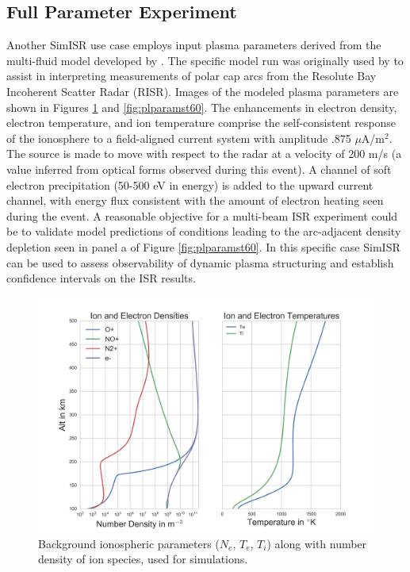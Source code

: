 \subsection{Full Parameter Experiment}
\label{sec:fullparam}
Another SimISR use case employs input plasma parameters derived from the multi-fluid model developed by \cite{semeter:plasmatransport2012}. The specific model run was originally used by \cite{Perry:2015jf} to assist in interpreting measurements of polar cap arcs from the Resolute Bay Incoherent Scatter Radar (RISR). Images of the modeled plasma parameters are shown in Figures \ref{fig:plparamst0} and \ref{fig:plparamst60}. The enhancements in electron density, electron temperature, and ion temperature comprise the self-consistent response of the ionosphere to a field-aligned current system with amplitude .875 $\mu$A/m$^2$.  The source is made to move with respect to the radar at a velocity of 200 m/s (a  value inferred from optical forms observed during this event).  A channel of soft electron precipitation (50-500 eV in energy) is added to the upward current channel, with energy flux consistent with the amount of electron heating seen during the event.  A reasonable objective for a multi-beam ISR experiment could be to validate model predictions of conditions leading to the arc-adjacent density depletion seen in panel a of Figure \ref{fig:plparamst60}.  In this specific case SimISR can be used to assess observability of dynamic plasma structuring and establish confidence intervals on the ISR results.  

\begin{figure}[!t]
\centering
\includegraphics[width=6in]{backgroundallparams}
\caption{Background ionospheric parameters ($N_e$, $T_e$, $T_i$) along with number density of ion species, used for simulations.}
\label{fig:plparamst0}
\end{figure}

